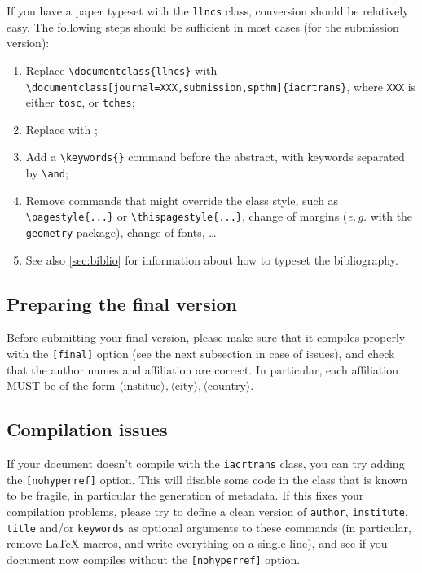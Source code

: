 \documentclass{iacrtrans}
\begin{document}
If you have a paper typeset with the \texttt{llncs} class, conversion
should be relatively easy.  The following steps should be sufficient
in most cases (for the submission version):
\begin{enumerate}
\item Replace \verb+\documentclass{llncs}+ with\\
    \verb+\documentclass[journal=XXX,submission,spthm]{iacrtrans}+,
    where \verb+XXX+ is either \verb+tosc+, or \verb+tches+;
\item Replace \verb++ with
  \verb++;
\item Add a \verb+\keywords{}+ command before the abstract, with
  keywords separated by \verb+\and+;
\item Remove commands that might override the class style, such as
  \verb+\pagestyle{...}+ or \verb+\thispagestyle{...}+,
  change of margins (\emph{e.\,g.}  with the \texttt{geometry} package),
  change of fonts, \ldots
\item See also \autoref{sec:biblio} for information about how to
  typeset the bibliography.
\end{enumerate}

\subsection{Preparing the final version}

Before submitting your final version, please make sure that it compiles
properly with the \texttt{[final]} option (see the next subsection in
case of issues), and check that the author names and affiliation are
correct.  In particular, each affiliation MUST be of the form
$\langle\text{institue}\rangle, \langle\text{city}\rangle,
\langle\text{country}\rangle$.

\subsection{Compilation issues}

If your document doesn't compile with the \texttt{iacrtrans} class,
you can try adding the \texttt{[nohyperref]} option.  This will
disable some code in the class that is known to be fragile, in
particular the generation of metadata.  If this fixes your compilation
problems, please try to define a clean version of \texttt{author}, \texttt{institute},
\texttt{title} and/or \texttt{keywords} as optional arguments to
these commands (in particular, remove \LaTeX{} macros, and write
everything on a single line), and see if you document now compiles
without the \texttt{[nohyperref]} option.
\end{document}

